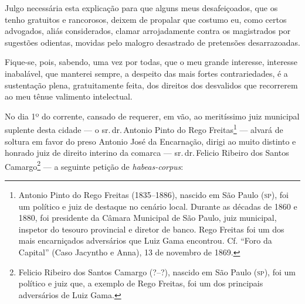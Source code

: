 Julgo necessária esta explicação para que alguns meus desafeiçoados, que
os tenho gratuitos e rancorosos, deixem de propalar que costumo eu, como
certos advogados, aliás considerados, clamar arrojadamente contra os
magistrados por sugestões odientas, movidas pelo malogro desastrado de
pretensões desarrazoadas.

Fique-se, pois, sabendo, uma vez por todas, que o meu grande interesse,
interesse inabalável, que manterei sempre, a despeito das mais fortes
contrariedades, é a sustentação plena, gratuitamente feita, dos direitos
dos desvalidos que recorrerem ao meu tênue valimento intelectual.

\asterisc{}

No dia 1º do corrente, cansado de requerer, em vão, ao meritíssimo juiz
municipal suplente desta cidade --- o sr.\,dr.\,Antonio Pinto do Rego
Freitas\footnote{Antonio Pinto do Rego Freitas (1835--1886), nascido em
  São Paulo (\textsc{sp}), foi um político e juiz de destaque no cenário local.
  Durante as décadas de 1860 e 1880, foi presidente da Câmara Municipal
  de São Paulo, juiz municipal, inspetor do tesouro provincial e diretor
  de banco. Rego Freitas foi um dos mais encarniçados adversários que
  Luiz Gama encontrou. Cf. ``Foro da Capital'' (Caso Jacyntho e
  Anna), 13 de novembro de 1869.\label{rego}} ---  alvará de soltura em favor do preso Antonio
José da Encarnação, dirigi ao muito distinto e honrado juiz de direito
interino da comarca --- sr.\,dr.\,Felicio Ribeiro dos Santos
Camargo\footnote{Felicio Ribeiro dos Santos Camargo (?--?), nascido em
  São Paulo (\textsc{sp}), foi um político e juiz que, a exemplo de Rego Freitas,
  foi um dos principais adversários de Luiz Gama.\label{felicio}} --- a seguinte petição
de \emph{habeas-corpus}:

